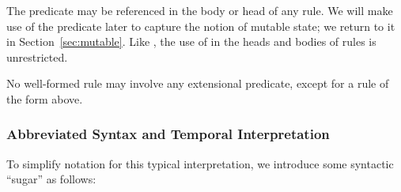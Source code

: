 The predicate  may be referenced in the body or head of any \lang rule.  
We will make use of the predicate  later to capture the notion of mutable state; we return to it in Section~\ref{sec:mutable}. 
Like , the use of  in the heads and bodies of rules is unrestricted.

\vspace{1.2em}
No well-formed \lang rule may involve any extensional predicate, except for a rule of the form above.

\subsubsection{Abbreviated Syntax and Temporal Interpretation}

\label{sec:abbrvsyntax}



To simplify \lang notation for this typical interpretation, we
introduce some syntactic ``sugar'' as follows:

